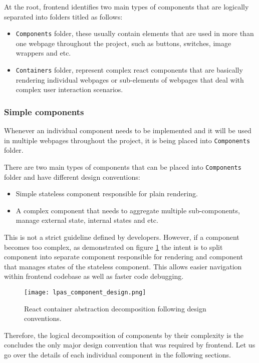 At the root, \lpa{} frontend identifies two main types of components that are logically separated into folders titled as follows:
\begin{itemize}
	\item \texttt{Components} folder, these usually contain elements that are used in more than one webpage throughout the project, such as buttons, switches, image wrappers and etc.
	\item \texttt{Containers} folder, represent complex react components that are basically rendering individual webpages or sub-elements of webpages that deal with complex user interaction scenarios.
\end{itemize}

\subsubsection{Simple components}

Whenever an individual component needs to be implemented and it will be used in multiple webpages throughout the project, it is being placed into \texttt{Components} folder.

There are two main types of components that can be placed into \texttt{Components} folder and have different design conventions:
\begin{itemize}
	\item Simple stateless component responsible for plain rendering.
	\item A complex component that needs to aggregate multiple sub-components, manage external state, internal states and etc.
\end{itemize}


This is not a strict guideline defined by \lpa{} developers. However, if a component becomes too complex, as demonstrated on figure \ref{fig:lpas_component_design} the intent is to split component into separate component responsible for rendering and component that manages states of the stateless component. This allows easier navigation within frontend codebase as well as faster code debugging. 

\begin{figure}[h]
\centering
\texttt{[image: lpas\_component\_design.png]}
\caption{React container abstraction decomposition following \lpas{} design conventions.}
\label{fig:lpas_component_design}
\end{figure}

Therefore, the logical decomposition of components by their complexity is the concludes the only major design convention that was required by \lpa{} frontend. Let us go over the details of each individual component in the following sections.

